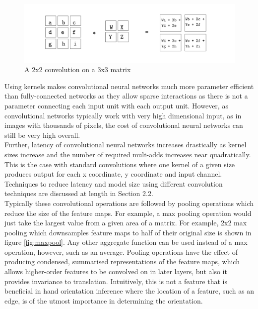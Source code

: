 \documentclass{article}
\begin{document}
\begin{figure}
  \includegraphics[width=\linewidth]{convolutionexample.pdf}
  \caption{A 2x2 convolution on a 3x3 matrix}
  \label{fig:convolution}
\end{figure}


Using kernels makes convolutional neural networks much more parameter efficient than fully-connected networks as they allow sparse interactions as there is not a parameter connecting each input unit with each output unit. However, as convolutional networks typically work with very high dimensional input, as in images with thousands of pixels, the cost of convolutional neural networks can still be very high overall. \\

Further, latency of convolutional neural networks increases drastically as kernel sizes increase and the number of required mult-adds increases near quadratically. This is the case with standard convolutions where one kernel of a given size produces output for each x coordinate, y coordinate and input channel. Techniques to reduce latency and model size using different convolution techniques are discussed at length in Section 2.2. \\

Typically these convolutional operations are followed by pooling operations which reduce the size of the feature maps. For example, a max pooling operation would just take the largest value from a given area of a matrix. For example, 2x2 max pooling which downsamples feature maps to half of their original size is shown in figure \ref{fig:maxpool}. Any other aggregate function can be used instead of a max operation, however, such as an average. Pooling operations have the effect of producing condensed, summarised representations of the feature maps, which allows higher-order features to be convolved on in later layers, but also it provides invariance to translation. Intuitively, this is not a feature that is beneficial in hand orientation inference where the location of a feature, such as an edge, is of the utmost importance in determining the orientation. \\
\end{document}

